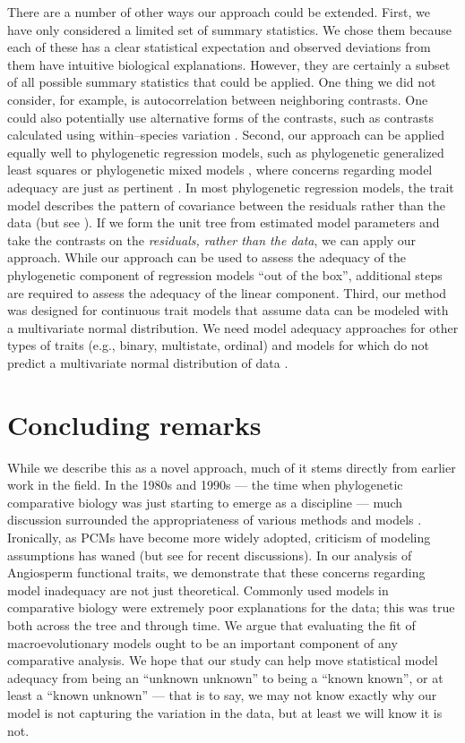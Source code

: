\documentclass[a4paper,12pt]{article}
\begin{document}
There are a number of other ways our approach could be extended. First, we have only considered a limited set of summary statistics. We chose them because each of these has a clear statistical expectation and observed deviations from them have intuitive biological explanations. However, they are certainly a subset of all possible summary statistics that could be applied. One thing we did not consider, for example, is autocorrelation between neighboring contrasts. One could also potentially use alternative forms of the contrasts, such as contrasts calculated using within--species variation \citep{Felsenstein2008}. Second, our approach can be applied equally well to phylogenetic regression models, such as phylogenetic generalized least squares \citep{Grafen1989} or phylogenetic mixed models \citep{Lynch1991, Hadfield2010}, where concerns regarding model adequacy are just as pertinent \citep{Hansen2012}. In most phylogenetic regression models, the trait model describes the pattern of covariance between the residuals rather than the data \citep{Rohlf2001, Rohlf2006} (but see \citep{Hansen2008}). If we form the unit tree from estimated model parameters and take the contrasts on the \emph{residuals, rather than the data}, we can apply our approach. While our approach can be used to assess the adequacy of the phylogenetic component of regression models ``out of the box'', additional steps are required to assess the adequacy of the linear component. Third, our method was designed for continuous trait models that assume data can be modeled with a multivariate normal distribution. We need model adequacy approaches for other types of traits (e.g., binary, multistate, ordinal) and models for which do not predict a multivariate normal distribution of data \citep{Landis2012}.

\section{Concluding remarks}
While we describe this as a novel approach, much of it stems directly from earlier work in the field. In the 1980s and 1990s --- the time when phylogenetic comparative biology was just starting to emerge as a discipline --- much discussion surrounded the appropriateness of various methods and models \citep{Felsenstein1985, Felsenstein1988, HarveyPagel1991, Garland1992, Pagel1993, Diaz1996, Price1997, Garland1999, GarlandIves2000}. Ironically, as PCMs have become more widely adopted, criticism of modeling assumptions has waned (but see \citep{Felsenstein2012, Hansen2012} for recent discussions). In our analysis of Angiosperm functional traits, we demonstrate that these concerns regarding model inadequacy are not just theoretical. Commonly used models in comparative biology were extremely poor explanations for the data; this was true both across the tree and through time. We argue that evaluating the fit of macroevolutionary models ought to be an important component of any comparative analysis. We hope that our study can help move statistical model adequacy from being an ``unknown unknown''  to being a ``known known'', or at least a ``known unknown'' --- that is to say, we may not know exactly why our model is not capturing the variation in the data, but at least we will know it is not.
\end{document}
